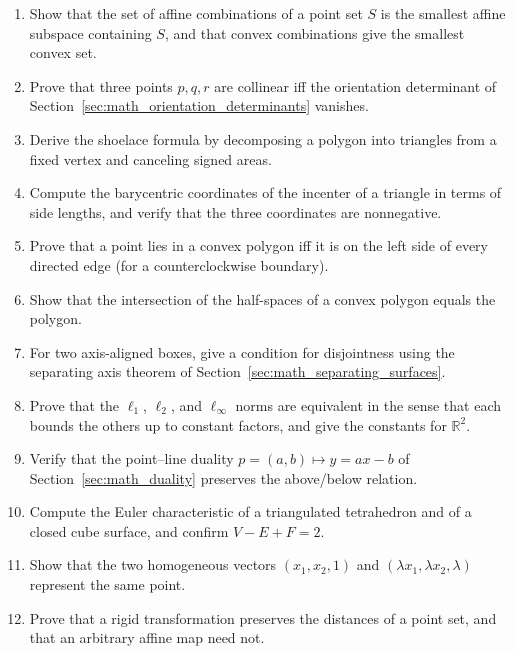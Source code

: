 \begin{enumerate}
  \item Show that the set of affine combinations of a point set $S$ is the
    smallest affine subspace containing $S$, and that convex combinations
    give the smallest convex set.
  \item Prove that three points $p,q,r$ are collinear iff the orientation
    determinant of Section~\ref{sec:math_orientation_determinants} vanishes.
  \item Derive the shoelace formula by decomposing a polygon into
    triangles from a fixed vertex and canceling signed areas.
  \item Compute the barycentric coordinates of the incenter of a triangle
    in terms of side lengths, and verify that the three coordinates are
    nonnegative.
  \item Prove that a point lies in a convex polygon iff it is on the left
    side of every directed edge (for a counterclockwise boundary).
  \item Show that the intersection of the half-spaces of a convex polygon
    equals the polygon.
  \item For two axis-aligned boxes, give a condition for disjointness using
    the separating axis theorem of Section~\ref{sec:math_separating_surfaces}.
  \item Prove that the $\ell_1$, $\ell_2$, and $\ell_\infty$ norms are
    equivalent in the sense that each bounds the others up to constant
    factors, and give the constants for $\mathbb{R}^2$.
  \item Verify that the point--line duality $p=(a,b)\mapsto y=ax-b$ of
    Section~\ref{sec:math_duality} preserves the above/below relation.
  \item Compute the Euler characteristic of a triangulated tetrahedron and
    of a closed cube surface, and confirm $V-E+F=2$.
  \item Show that the two homogeneous vectors $(x_1,x_2,1)$ and
    $(\lambda x_1,\lambda x_2,\lambda)$ represent the same point.
  \item Prove that a rigid transformation preserves the distances of a
    point set, and that an arbitrary affine map need not.
\end{enumerate}
